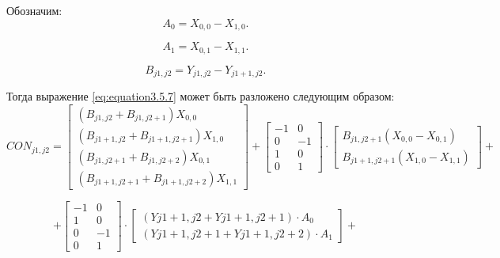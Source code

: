 Обозначим:
\begin{equation}
	\label{eq:equation3.5.8}
A_0 = X_{0,0} - X_{1,0}.	
\end{equation}

\begin{equation}
	\label{eq:equation3.5.9}
	A_1 = X_{0,1} - X_{1,1}.	
\end{equation}

\begin{equation}
	\label{eq:equation3.5.10}
	B_{j1,j2} = Y_{j1,j2} - Y_{j1+1,j2}.	
\end{equation}

Тогда выражение \ref{eq:equation3.5.7} может быть разложено следующим образом:
\begin{equation}
\label{eq:equation3.5.11}
CON_{j1,j2} = 
\begin{bmatrix}
\left( {B_{j1,j2} + B_{j1,j2+1}} \right) X_{0,0} \\
\left( {B_{j1+1,j2} + B_{j1+1,j2+1}} \right) X_{1,0} \\
\left( {B_{j1,j2+1} + B_{j1,j2+2}} \right) X_{0,1} \\
\left( {B_{j1+1,j2+1} + B_{j1+1,j2+2}} \right) X_{1,1}
\end{bmatrix}
+
\begin{bmatrix}
-1 & 0 \\
0 & -1 \\
1 & 0  \\
0 & 1	
\end{bmatrix}
\cdot
\begin{bmatrix}
	B_{j1,j2+1} \left( {X_{0,0} - X_{0,1}} \right) \\
	B_{j1+1,j2+1} \left( {X_{1,0} - X_{1,1}} \right)	
\end{bmatrix}
+
\end{equation}

\begin{equation}
\label{eq:equation3.5.12}
+ 
\begin{bmatrix}
-1 & 0 \\
1 & 0 \\
0 & -1  \\
0 & 1	
\end{bmatrix}
\cdot
\begin{bmatrix}
\left(	{Y{j1+1,j2} + Y{j1+1,j2+1}} \right) \cdot A_0 \\
\left(	{Y{j1+1,j2+1} + Y{j1+1,j2+2}} \right) \cdot A_1	
\end{bmatrix}
+
\end{equation}

